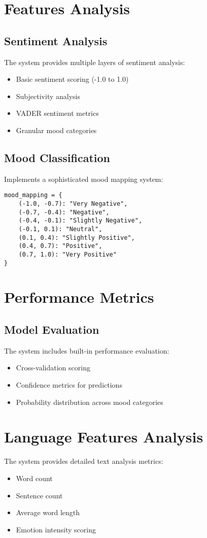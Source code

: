 \documentclass[12pt]{article}
\begin{document}
\section{Features Analysis}
\subsection{Sentiment Analysis}
The system provides multiple layers of sentiment analysis:
\begin{itemize}
    \item Basic sentiment scoring (-1.0 to 1.0)
    \item Subjectivity analysis
    \item VADER sentiment metrics
    \item Granular mood categories
\end{itemize}

\subsection{Mood Classification}
Implements a sophisticated mood mapping system:
\begin{lstlisting}
mood_mapping = {
    (-1.0, -0.7): "Very Negative",
    (-0.7, -0.4): "Negative",
    (-0.4, -0.1): "Slightly Negative",
    (-0.1, 0.1): "Neutral",
    (0.1, 0.4): "Slightly Positive",
    (0.4, 0.7): "Positive",
    (0.7, 1.0): "Very Positive"
}
\end{lstlisting}

\section{Performance Metrics}
\subsection{Model Evaluation}
The system includes built-in performance evaluation:
\begin{itemize}
    \item Cross-validation scoring
    \item Confidence metrics for predictions
    \item Probability distribution across mood categories
\end{itemize}

\section{Language Features Analysis}
The system provides detailed text analysis metrics:
\begin{itemize}
    \item Word count
    \item Sentence count
    \item Average word length
    \item Emotion intensity scoring
\end{itemize}
\end{document}
